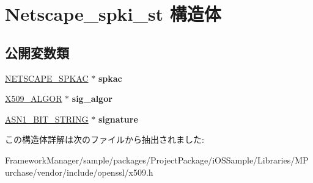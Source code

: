 \hypertarget{struct_netscape__spki__st}{}\section{Netscape\+\_\+spki\+\_\+st 構造体}
\label{struct_netscape__spki__st}
\subsection*{公開変数類}
\begin{DoxyCompactItemize}
\item 
\hypertarget{struct_netscape__spki__st_a724664bfc3a3f03a4f8238be98807283}{}\hyperlink{struct_netscape__spkac__st}{N\+E\+T\+S\+C\+A\+P\+E\+\_\+\+S\+P\+K\+A\+C} $\ast$ {\bfseries spkac}\label{struct_netscape__spki__st_a724664bfc3a3f03a4f8238be98807283}

\item 
\hypertarget{struct_netscape__spki__st_a490105a4ef783d32f79fd00f72f8aa62}{}\hyperlink{struct_x509__algor__st}{X509\+\_\+\+A\+L\+G\+O\+R} $\ast$ {\bfseries sig\+\_\+algor}\label{struct_netscape__spki__st_a490105a4ef783d32f79fd00f72f8aa62}

\item 
\hypertarget{struct_netscape__spki__st_a8fe9d3a3731234862a6ea254e206140e}{}\hyperlink{structasn1__string__st}{A\+S\+N1\+\_\+\+B\+I\+T\+\_\+\+S\+T\+R\+I\+N\+G} $\ast$ {\bfseries signature}\label{struct_netscape__spki__st_a8fe9d3a3731234862a6ea254e206140e}

\end{DoxyCompactItemize}


この構造体詳解は次のファイルから抽出されました\+:\begin{DoxyCompactItemize}
\item 
Framework\+Manager/sample/packages/\+Project\+Package/i\+O\+S\+Sample/\+Libraries/\+M\+Purchase/vendor/include/openssl/x509.\+h\end{DoxyCompactItemize}
